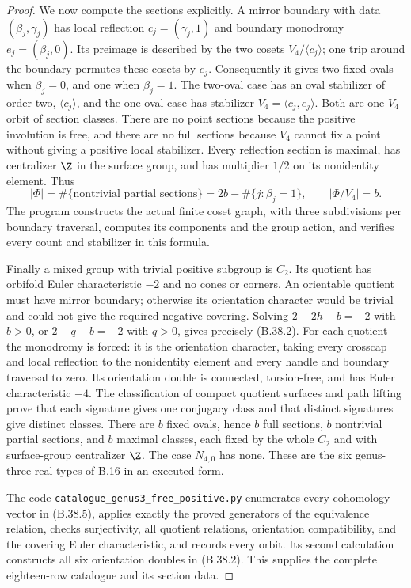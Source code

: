 \begin{proof}
We now compute the sections explicitly.  A mirror boundary
with data $(\beta_j,\gamma_j)$ has local reflection
$c_j=(\gamma_j,1)$ and boundary monodromy
$e_j=(\beta_j,0)$.
Its preimage is described by the two cosets
$V_4/\langle c_j\rangle$; one trip around the boundary
permutes these cosets by $e_j$.
Consequently it gives two fixed ovals when $\beta_j=0$,
and one when $\beta_j=1$.
The two-oval case has an oval stabilizer of order two,
$\langle c_j\rangle$, and the one-oval case has stabilizer
$V_4=\langle c_j,e_j\rangle$.
Both are one $V_4$-orbit of section classes.
There are no point sections because the positive involution
is free, and there are no full sections because $V_4$ cannot
fix a point without giving a positive local stabilizer.
Every reflection section is maximal, has centralizer $\Z$
in the surface group, and has multiplier $1/2$ on its
nonidentity element.  Thus
\[
 |\Phi|=\#\{\text{nontrivial partial sections}\}
       =2b-\#\{j:\beta_j=1\},
 \qquad |\Phi/V_4|=b.                                 \tag{B.38.6}
\]
The program constructs the actual finite coset graph, with
three subdivisions per boundary traversal, computes its
components and the group action, and verifies every count
and stabilizer in this formula.

Finally a mixed group with trivial positive subgroup is $C_2$.
Its quotient has orbifold Euler characteristic $-2$ and no
cones or corners.  An orientable quotient must have mirror
boundary; otherwise its orientation character would be
trivial and could not give the required negative covering.
Solving $2-2h-b=-2$ with $b>0$, or $2-q-b=-2$ with $q>0$,
gives precisely (B.38.2).
For each quotient the monodromy is forced: it is the orientation
character, taking every crosscap and local reflection to the
nonidentity element and every handle and boundary traversal
to zero.  Its orientation double is connected, torsion-free,
and has Euler characteristic $-4$.  The classification of
compact quotient surfaces and path lifting prove that each
signature gives one conjugacy class and that distinct signatures
give distinct classes.
There are $b$ fixed ovals, hence $b$ full sections, $b$
nontrivial partial sections, and $b$ maximal classes, each
fixed by the whole $C_2$ and with surface-group centralizer
$\Z$.  The case $N_{4,0}$ has none.  These are the six
genus-three real types of B.16 in an executed form.

The code \texttt{catalogue\_genus3\_free\_positive.py} enumerates
every cohomology vector in (B.38.5), applies exactly the
proved generators of the equivalence relation, checks
surjectivity, all quotient relations, orientation compatibility,
and the covering Euler characteristic, and records every
orbit.  Its second calculation constructs all six orientation
doubles in (B.38.2).  This supplies the complete eighteen-row
catalogue and its section data.
\end{proof}
